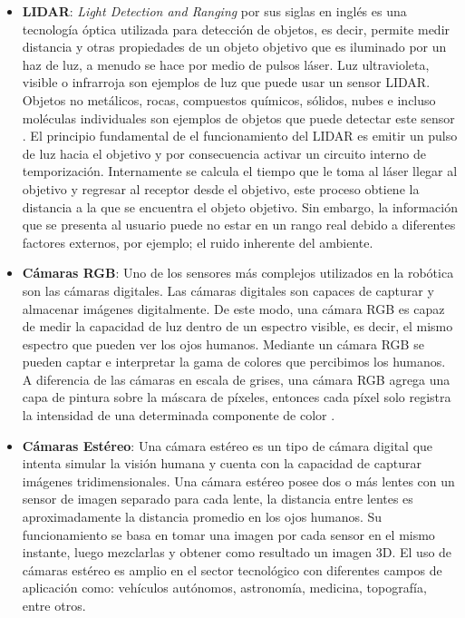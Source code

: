\begin{itemize}
    \item \textbf{LIDAR}: \textit{Light Detection and Ranging} por sus siglas en inglés es una tecnología óptica utilizada para detección de objetos, es decir, permite medir distancia y otras propiedades de un objeto objetivo que es iluminado por un haz de luz, a menudo se hace por medio de pulsos láser. Luz ultravioleta, visible o infrarroja son ejemplos de luz que puede usar un sensor LIDAR. Objetos no metálicos, rocas, compuestos químicos, sólidos, nubes e incluso moléculas individuales son ejemplos de objetos que puede detectar este sensor \cite{rathod2013autonomous}.
    El principio fundamental de el funcionamiento del LIDAR es emitir un pulso de luz hacia el objetivo y por consecuencia activar un circuito interno de temporización. Internamente se calcula el tiempo que le toma al láser llegar al objetivo y regresar al receptor desde el objetivo, este proceso obtiene la distancia a la que se encuentra el objeto objetivo. Sin embargo, la información que se presenta al usuario puede no estar en un rango real debido a diferentes factores externos, por ejemplo; el ruido inherente del ambiente.

    
    \item \textbf{Cámaras RGB}: Uno de los sensores más complejos utilizados en la robótica son las cámaras digitales. Las cámaras digitales son capaces de capturar y almacenar imágenes digitalmente. De este modo, una cámara RGB es capaz de medir la capacidad de luz dentro de un espectro visible, es decir, el mismo espectro que pueden ver los ojos humanos. Mediante un cámara RGB se pueden captar e interpretar la gama de colores que percibimos los humanos. A diferencia de las cámaras en escala de grises, una cámara RGB agrega una capa de pintura sobre la máscara de píxeles, entonces cada píxel solo registra la intensidad de una determinada componente de color \cite{braunl2003embedded}.
    
    \item \textbf{Cámaras Estéreo}: Una cámara estéreo es un tipo de cámara digital que intenta simular la visión humana y cuenta con la capacidad de capturar imágenes tridimensionales. Una cámara estéreo posee dos o más lentes con un sensor de imagen separado para cada lente, la distancia entre lentes es aproximadamente la distancia promedio en los ojos humanos. Su funcionamiento se basa en tomar una imagen por cada sensor en el mismo instante, luego mezclarlas y obtener como resultado un imagen 3D. El uso de cámaras estéreo es amplio en el sector tecnológico con diferentes campos de aplicación como: vehículos autónomos, astronomía, medicina, topografía, entre otros.
    

\end{itemize}
